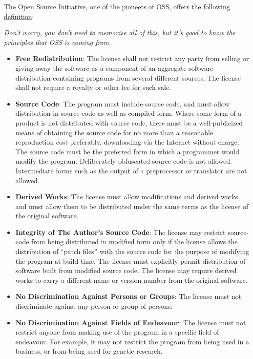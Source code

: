 \documentclass[]{book}
\begin{document}
{{{{{{{{{{{The \href{https://opensource.org/}{Open Source Initiative}, one of the pioneers of OSS, offers the following \href{https://en.wikipedia.org/wiki/The_Open_Source_Definition\#Definition}{definition}:

\emph{Don't worry, you don't need to memorise all of this, but it's good to know the principles that OSS is coming from.}

\begin{itemize}
\item
  \textbf{Free Redistribution}: The license shall not restrict any party from selling or giving away the software as a component of an aggregate software distribution containing programs from several different sources. The license shall not require a royalty or other fee for such sale.
\item
  \textbf{Source Code}: The program must include source code, and must allow distribution in source code as well as compiled form. Where some form of a product is not distributed with source code, there must be a well-publicized means of obtaining the source code for no more than a reasonable reproduction cost preferably, downloading via the Internet without charge. The source code must be the preferred form in which a programmer would modify the program. Deliberately obfuscated source code is not allowed. Intermediate forms such as the output of a preprocessor or translator are not allowed.
\item
  \textbf{Derived Works}: The license must allow modifications and derived works, and must allow them to be distributed under the same terms as the license of the original software.
\item
  \textbf{Integrity of The Author's Source Code}: The license may restrict source-code from being distributed in modified form only if the license allows the distribution of ``patch files'' with the source code for the purpose of modifying the program at build time. The license must explicitly permit distribution of software built from modified source code. The license may require derived works to carry a different name or version number from the original software.
\item
  \textbf{No Discrimination Against Persons or Groups}: The license must not discriminate against any person or group of persons.
\item
  \textbf{No Discrimination Against Fields of Endeavour}: The license must not restrict anyone from making use of the program in a specific field of endeavour. For example, it may not restrict the program from being used in a business, or from being used for genetic research.

\end{itemize}}}}}}}}}}}}
\end{document}
